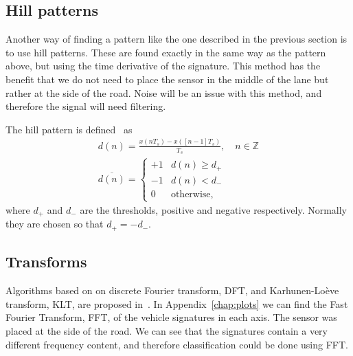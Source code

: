\subsection{Hill patterns}
Another way of finding a pattern like the one described in the previous section is to use hill patterns. These are found exactly in the same way as the pattern above, but using the time derivative of the signature. This method has the benefit that we do not need to place the sensor in the middle of the lane but rather at the side of the road. Noise will be an issue with this method, and therefore the signal will need filtering.

The hill pattern is defined~\cite{path2007} as
\begin{align}
 d(n) = \frac{x(nT_s)-x([n-1]T_s)}{T_s},\quad n \in \mathbb{Z}\\
 \overline{d(n)} = \left\{\begin{array}{cl}
+1 & d(n) \geq d_+\\
- 1 & d(n) < d_-\\
0 & \text{otherwise},
\end{array}\right.
\end{align}
where $d_+$ and $d_-$ are the thresholds, positive and negative respectively. Normally they are chosen so that $d_+ = -d_-$.

\subsection{Transforms}
Algorithms based on on discrete Fourier transform, DFT, and Karhunen-Lo\`{e}ve transform, KLT, are proposed in~\cite{sun2000}. In \mbox{Appendix~\ref{chap:plots}} we can find the Fast Fourier Transform, FFT, of the vehicle signatures in each axis. The sensor was placed at the side of the road. We can see that the signatures contain a very different frequency content, and therefore classification could be done using FFT.

%
%
%

